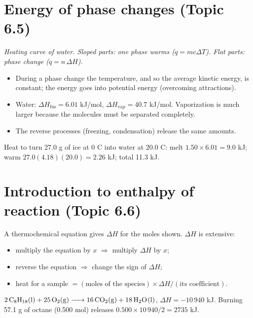 \documentclass[11pt]{article}
\begin{document}
\section{Energy of phase changes (Topic 6.5)}\label{t:6.5}
\begin{center}

{\small\itshape Heating curve of water. Sloped parts: one phase warms ($q = mc\Delta T$). Flat parts: phase change ($q = n\,\Delta H$).}
\end{center}
\begin{itemize}
\item During a phase change the temperature, and so the average kinetic energy, is constant; the energy goes into potential energy (overcoming attractions).
\item Water: $\Delta H_{\text{fus}} = 6.01$ kJ/mol, $\Delta H_{\text{vap}} = 40.7$ kJ/mol. Vaporization is much larger because the molecules must be separated completely.
\item The reverse processes (freezing, condensation) release the same amounts.
\end{itemize}
 Heat to turn 27.0 g of ice at 0 \textdegree C into water at 20.0 \textdegree C: melt $1.50 \times 6.01 = 9.0$ kJ; warm $27.0(4.18)(20.0) = 2.26$ kJ; total 11.3 kJ.

\section{Introduction to enthalpy of reaction (Topic 6.6)}\label{t:6.6}
A thermochemical equation gives $\Delta H$ for the moles shown. $\Delta H$ is extensive:
\begin{itemize}
\item multiply the equation by $x$ $\Rightarrow$ multiply $\Delta H$ by $x$;
\item reverse the equation $\Rightarrow$ change the sign of $\Delta H$;
\item heat for a sample $= (\text{moles of the species}) \times \Delta H/(\text{its coefficient})$.
\end{itemize}
 $\ce{2C8H18(l) + 25O2(g) -> 16CO2(g) + 18H2O(l)}$, $\Delta H = -10\,940$ kJ. Burning 57.1 g of octane (0.500 mol) releases $0.500 \times 10\,940/2 = 2735$ kJ.
\end{document}
